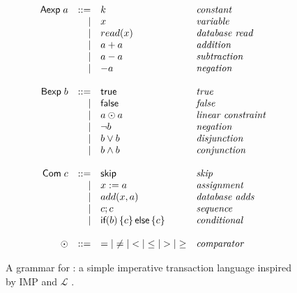 \newcommand{\aexp}{\textsf{Aexp}}
\newcommand{\bexp}{\textsf{Bexp}}
\newcommand{\com}{\textsf{Com}}
\newcommand{\impskip}{\textsf{skip}}
\newcommand{\impif}[3]{\textsf{if}(#1)\set{#2}\textsf{else}\set{#3}}
\begin{figure}[h]
  \centering
  \begin{gather*}
    \begin{array}{rrll}
      \aexp\; a & ::= & k       & \text{\emph{constant}} \\
                & |   & x       & \text{\emph{variable}} \\
                & |   & read(x) & \text{\emph{database read}} \\
                & |   & a + a   & \text{\emph{addition}} \\
                & |   & a - a   & \text{\emph{subtraction}} \\
                & |   & - a     & \text{\emph{negation}} \\
      &&& \\
      \bexp\; b & ::= & \textsf{true}  & \text{\emph{true}} \\
                & |   & \textsf{false} & \text{\emph{false}} \\
                & |   & a \odot a      & \text{\emph{linear constraint}} \\
                & |   & \lnot b        & \text{\emph{negation}} \\
                & |   & b \lor b       & \text{\emph{disjunction}} \\
                & |   & b \land b      & \text{\emph{conjunction}} \\
      &&& \\
      \com\; c  & ::= & \impskip        & \text{\emph{skip}} \\
                & |   & x := a          & \text{\emph{assignment}} \\
                & |   & add(x, a)       & \text{\emph{database adds}} \\
                & |   & c; c            & \text{\emph{sequence}} \\
                & |   & \impif{b}{c}{c} & \text{\emph{conditional}} \\
      &&& \\
      \odot & ::= & =    \vert
                    \neq \vert
                    <    \vert
                    \leq \vert
                    >    \vert
                    \geq & \text{\emph{comparator}}
    \end{array}
  \end{gather*}

  \caption{
    A grammar for \imp{}: a simple imperative transaction language inspired by
    IMP \cite{winskel1993formal} and $\mathcal{L}$ \cite{roy2015homeostasis}.
  }
  \label{fig:imp-grammar}
\end{figure}

